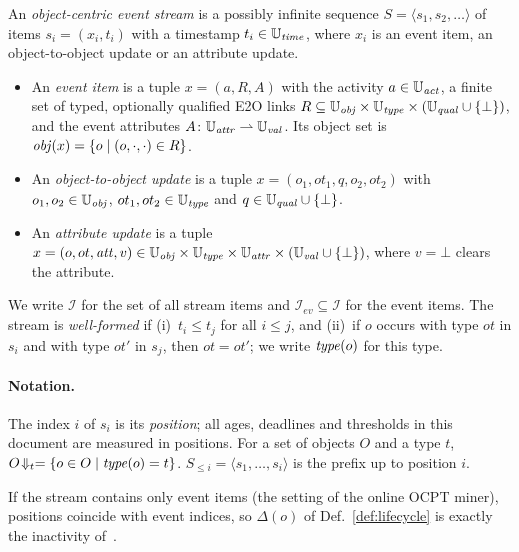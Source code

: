 \begin{definition}\label{def:stream}
An \emph{object-centric event stream} is a possibly infinite sequence
$S = \langle s_1, s_2, \dots \rangle$ of items $s_i = (x_i, t_i)$ with a
timestamp $t_i \in \mathbb{U}_{\mathit{time}}$, where $x_i$ is an event item, an object-to-object
update or an attribute update.
\begin{itemize}
  \item An \emph{event item} is a tuple $x = (a, R, A)$ with the activity
        $a \in \mathbb{U}_{\mathit{act}}$, a finite set of typed, optionally qualified E2O links
        $R \subseteq \mathbb{U}_{\mathit{obj}} \times \mathbb{U}_{\mathit{type}} \times (\mathbb{U}_{\mathit{qual}} \cup \{\bot\})$, and the
        event attributes $A \colon \mathbb{U}_{\mathit{attr}} \rightharpoonup \mathbb{U}_{\mathit{val}}$.
        Its object set is $\mathit{obj}(x) = \{o \mid (o, \cdot, \cdot) \in R\}$.
  \item An \emph{object-to-object update} is a tuple
        $x = (o_1, ot_1, q, o_2, ot_2)$ with $o_1, o_2 \in \mathbb{U}_{\mathit{obj}}$,
        $ot_1, ot_2 \in \mathbb{U}_{\mathit{type}}$ and $q \in \mathbb{U}_{\mathit{qual}} \cup \{\bot\}$.
  \item An \emph{attribute update} is a tuple
        $x = (o, ot, \mathit{att}, v) \in \mathbb{U}_{\mathit{obj}} \times \mathbb{U}_{\mathit{type}} \times \mathbb{U}_{\mathit{attr}} \times (\mathbb{U}_{\mathit{val}} \cup \{\bot\})$,
        where $v = \bot$ clears the attribute.
\end{itemize}
We write $\mathcal{I}$ for the set of all stream items and
$\mathcal{I}_{\mathit{ev}} \subseteq \mathcal{I}$ for the event items.
The stream is \emph{well-formed} if
(i)~$t_i \le t_j$ for all $i \le j$, and
(ii)~if $o$ occurs with type $ot$ in $s_i$ and with type $ot'$ in $s_j$, then
$ot = ot'$; we write $\mathit{type}(o)$ for this type.
\end{definition}

\paragraph{Notation.}
The index $i$ of $s_i$ is its \emph{position}; all ages, deadlines and
thresholds in this document are measured in positions.
For a set of objects $O$ and a type $t$, $O\!\Downarrow_{t} = \{o \in O \mid \mathit{type}(o) = t\}$.
$S_{\le i} = \langle s_1, \dots, s_i \rangle$ is the prefix up to position $i$.

\begin{remark}
If the stream contains only event items (the setting of the online OCPT
miner), positions coincide with event indices, so $\Delta(o)$ of
Def.~\ref{def:lifecycle} is exactly the inactivity of~\cite{Muehlmeyer2026}.
\end{remark}

